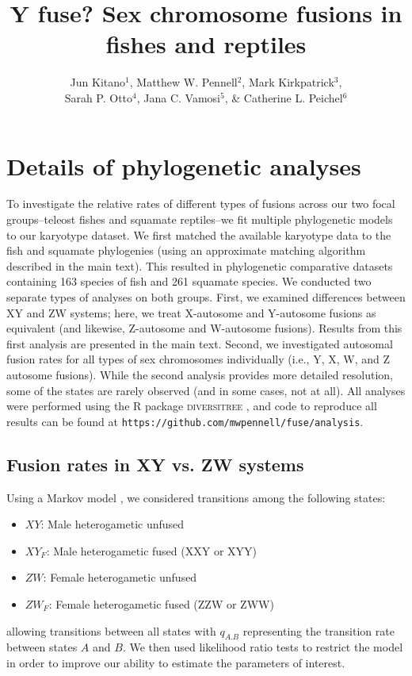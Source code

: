 \documentclass[12pt,twoside]{article}
\title{Y fuse? Sex chromosome fusions in fishes and reptiles}
\author{Jun Kitano$^1$, Matthew W. Pennell$^2$, Mark Kirkpatrick$^3$,\\ Sarah P. Otto$^4$, Jana C. Vamosi$^5$, \& Catherine L. Peichel$^6$}
\date{}
\begin{document}
\maketitle

\section{Details of phylogenetic analyses}

To investigate the relative rates of different types of fusions across our two focal groups--teleost fishes and squamate reptiles--we fit multiple phylogenetic models to our karyotype dataset. We first matched the available karyotype data to the fish \citep{Rabosky2013} and squamate \citep{squamatetree, PyronBurbrink2014} phylogenies (using an approximate matching algorithm described in the main text). This resulted in phylogenetic comparative datasets containing 163 species of fish and 261 squamate species.  We conducted two separate types of analyses on both groups. First, we examined differences between XY and ZW systems; here, we treat X-autosome and Y-autosome fusions as equivalent (and likewise, Z-autosome and W-autosome fusions). Results from this first analysis are presented in the main text. Second, we investigated autosomal fusion rates for all types of sex chromosomes individually (i.e., Y, X, W, and Z autosome fusions). While the second analysis provides more detailed resolution, some of the states are rarely observed (and in some cases, not at all). All analyses were performed using the R package \textsc{diversitree} \citep{FitzJohn2012}, and code to reproduce all results can be found at \texttt{https://github.com/mwpennell/fuse/analysis}. 

\subsection{Fusion rates in XY vs. ZW systems}

Using a Markov model \citep{Pagel1994}, we considered transitions among the following states:
\begin{itemize}
\item $XY$: Male heterogametic unfused
\item $XY_F$: Male heterogametic fused (XXY or XYY)
\item $ZW$: Female heterogametic unfused
\item $ZW_F$: Female heterogametic fused (ZZW or ZWW)
\end{itemize}
allowing transitions between all states with $q_{A.B}$ representing the transition rate between states $A$ and $B$. We then used likelihood ratio tests to restrict the model in order to improve our ability to estimate the parameters of interest. 
\end{document}
